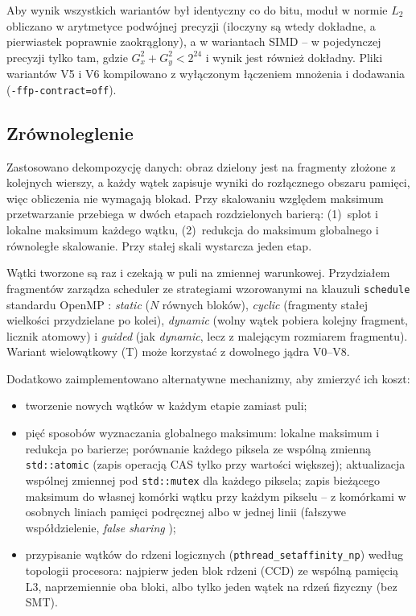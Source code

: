 \documentclass[12pt,a4paper]{article}
\newcommand{\kod}[1]{\texttt{#1}}
\begin{document}
Aby wynik wszystkich wariantów był identyczny co do bitu, moduł w normie $L_2$ obliczano w arytmetyce podwójnej precyzji (iloczyny są wtedy dokładne, a pierwiastek poprawnie zaokrąglony), a w wariantach SIMD -- w pojedynczej precyzji tylko tam, gdzie $G_x^2 + G_y^2 < 2^{24}$ i wynik jest również dokładny. Pliki wariantów V5 i V6 kompilowano z wyłączonym łączeniem mnożenia i dodawania (\kod{-ffp-contract=off}).

\subsection{Zrównoleglenie}

Zastosowano dekompozycję danych: obraz dzielony jest na fragmenty złożone z kolejnych wierszy, a każdy wątek zapisuje wyniki do rozłącznego obszaru pamięci, więc obliczenia nie wymagają blokad. Przy skalowaniu względem maksimum przetwarzanie przebiega w dwóch etapach rozdzielonych barierą: (1)~splot i lokalne maksimum każdego wątku, (2)~redukcja do maksimum globalnego i równoległe skalowanie. Przy stałej skali wystarcza jeden etap.

Wątki tworzone są raz i czekają w puli na zmiennej warunkowej. Przydziałem fragmentów zarządza scheduler ze strategiami wzorowanymi na klauzuli \kod{schedule} standardu OpenMP \cite{openmp}: \emph{static} ($N$ równych bloków), \emph{cyclic} (fragmenty stałej wielkości przydzielane po kolei), \emph{dynamic} (wolny wątek pobiera kolejny fragment, licznik atomowy) i \emph{guided} (jak \emph{dynamic}, lecz z malejącym rozmiarem fragmentu). Wariant wielowątkowy (T) może korzystać z dowolnego jądra V0--V8.

Dodatkowo zaimplementowano alternatywne mechanizmy, aby zmierzyć ich koszt:
\begin{itemize}
	\item tworzenie nowych wątków w każdym etapie zamiast puli;
	\item pięć sposobów wyznaczania globalnego maksimum: lokalne maksimum i redukcja po barierze; porównanie każdego piksela ze wspólną zmienną \kod{std::atomic} (zapis operacją CAS tylko przy wartości większej); aktualizacja wspólnej zmiennej pod \kod{std::mutex} dla każdego piksela; zapis bieżącego maksimum do własnej komórki wątku przy każdym pikselu -- z komórkami w osobnych liniach pamięci podręcznej albo w jednej linii (fałszywe współdzielenie, \emph{false sharing} \cite{drepper});
	\item przypisanie wątków do rdzeni logicznych (\kod{pthread\_setaffinity\_np}) według topologii procesora: najpierw jeden blok rdzeni (CCD) ze wspólną pamięcią L3, naprzemiennie oba bloki, albo tylko jeden wątek na rdzeń fizyczny (bez SMT).
\end{itemize}
\end{document}
